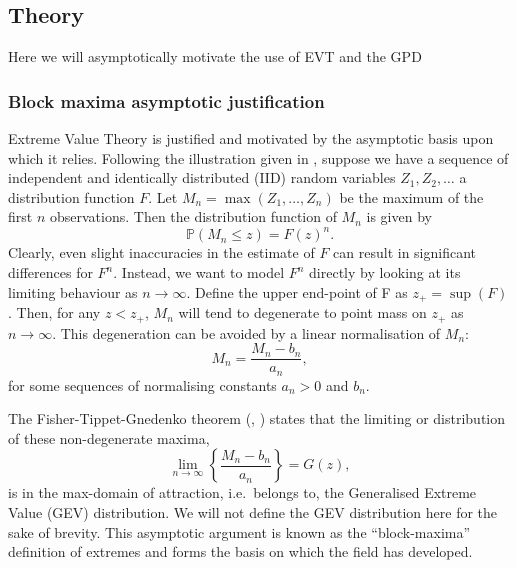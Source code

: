 \documentclass{article}
\numberwithin{equation}{section}
\begin{document}
\subsection{Theory}

Here we will asymptotically motivate the use of EVT and the GPD 



\subsubsection{Block maxima asymptotic justification} \label{subsubsec:asymptotic}


Extreme Value Theory is justified and motivated by the asymptotic basis upon which it relies.
Following the illustration given in \cite{Coles2001}, suppose we have a sequence of independent and identically distributed (IID) random variables $Z_1, Z_2, \ldots$ a distribution function $F$. 
Let $M_n = \max(Z_1, \ldots, Z_n)$ be the maximum of the first $n$ observations. %
Then the distribution function of $M_n$ is given by 
\[
  \mathbb{P}(M_n \le z) = {F(z)}^n.
\]
Clearly, even slight inaccuracies in the estimate of $F$ can result in significant differences for $F^n$.
Instead, we want to model $F^n$ directly by looking at its limiting behaviour as $n \to \infty$.
Define the upper end-point of F as $z_+ = \sup(F)$.
Then, for any $z < z_+$, $M_n$ will tend to degenerate to point mass on $z_+$ as $n \to \infty$.
This degeneration can be avoided by a linear normalisation of $M_n$:
\begin{equation}
  M_n = \frac{M_n - b_n}{a_n},
\end{equation}
for some sequences of normalising constants $a_n > 0$ and $b_n$.

The Fisher-Tippet-Gnedenko theorem (\cite{}, \cite{Gnedenko1943}) states that the limiting or distribution of these non-degenerate maxima,
\begin{equation} 
  \lim_{n \to \infty}\left\{\frac{M_n - b_n}{a_n}\right\} = G(z),
\end{equation}
is in the max-domain of attraction, i.e.\ belongs to, the Generalised Extreme Value (GEV) distribution. 
We will not define the GEV distribution here for the sake of brevity. 
This asymptotic argument is known as the ``block-maxima'' definition of extremes and forms the basis on which the field has developed.
\end{document}
